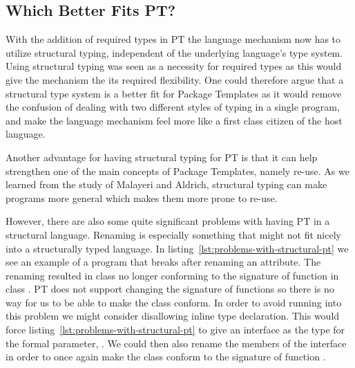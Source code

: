 %
%
%
%
%


\subsection{Which Better Fits PT?}\label{subsec:which-better-fits-pt?}

With the addition of required types in PT the language mechanism now has to utilize structural typing, independent of the underlying language's type system.
Using structural typing was seen as a necessity for required types as this would give the mechanism the its required flexibility.
One could therefore argue that a structural type system is a better fit for Package Templates as it would remove the confusion of dealing with two different styles of typing in a single program, and make the language mechanism feel more like a first class citizen of the host language.

Another advantage for having structural typing for PT is that it can help strengthen one of the main concepts of Package Templates, namely re-use.
As we learned from the study of Malayeri and Aldrich, structural typing can make programs more general which makes them more prone to re-use.

However, there are also some quite significant problems with having PT in a structural language.
Renaming is especially something that might not fit nicely into a structurally typed language.
In listing~\vref{lst:problems-with-structural-pt} we see an example of a program that breaks after renaming an attribute.
The renaming resulted in class  no longer conforming to the signature of function  in class .
PT does not support changing the signature of functions so there is no way for us to be able to make the  class conform.
In order to avoid running into this problem we might consider disallowing inline type declaration.
This would force listing~\vref{lst:problems-with-structural-pt} to give an interface as the type for the formal parameter, .
We could then also rename the members of the interface in order to once again make the  class conform to the signature of function .

